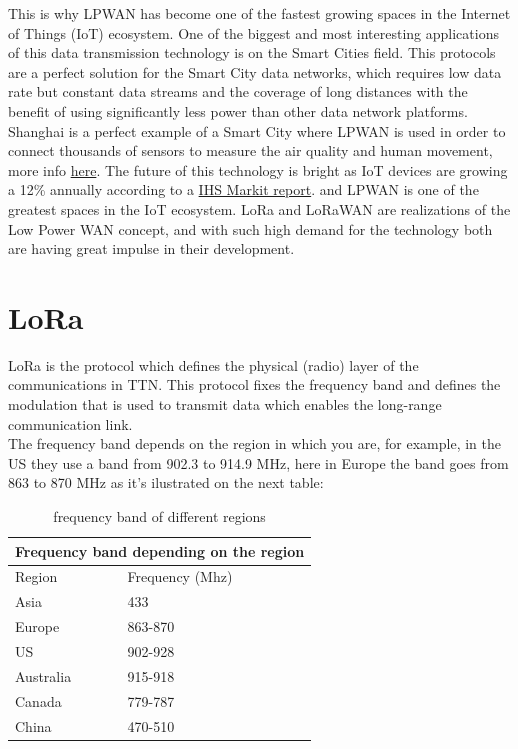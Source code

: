 This is why LPWAN has become one of the fastest growing spaces in
the Internet of Things (IoT) ecosystem. One of the biggest and most
interesting applications of this data transmission technology is on the
Smart Cities field. This protocols are a perfect solution for the Smart City
data networks, which requires low data rate but constant data streams
and the coverage of long distances with the benefit of using significantly
less power than other data network platforms. Shanghai is a perfect
example of a Smart City where LPWAN is used in order to connect
thousands of sensors to measure the air quality and human movement, more info 
\href{https://www.citiesforum.org/news/what-made-shanghai-the-worlds-no-1-smart-city}{here}.
The future of this technology is bright as IoT devices are growing a 12\%
annually according to a \href{https://cdn.ihs.com/www/pdf/IoT_ebook.pdf}{IHS Markit report}.
and LPWAN is one of the greatest spaces in the IoT ecosystem. LoRa and LoRaWAN are
realizations of the Low Power WAN concept, and with such high demand
for the technology both are having great impulse in their development.
\section{LoRa}
\label{sec:f-lora}
LoRa is the protocol which defines the physical (radio) layer of the
communications in TTN. This protocol fixes the
frequency band and defines the modulation that is used to transmit data
which enables the long-range communication link.\\
The frequency band depends on the region in which you are, for
example, in the US they use a band from 902.3 to 914.9 MHz, here in
Europe the band goes from 863 to 870 MHz as it's ilustrated on the next table:\\

\begin{table}[htbp]
\centering
\setlength{\arrayrulewidth}{0.5mm}
\setlength{\tabcolsep}{18pt}
\renewcommand{\arraystretch}{2}
\begin{tabular}{ |p{5cm}|p{5cm}| }
\hline
\multicolumn{2}{|c|}{\cellcolor[HTML]{85C1E9}Frequency band depending on the region } \\
\hline
\cellcolor[HTML]{AED6F1} Region & \cellcolor[HTML]{AED6F1} Frequency (Mhz) \\
\hline
Asia & 433  \\
Europe & 863-870 \\
US & 902-928 \\
Australia & 915-918  \\
Canada & 779-787  \\
China & 470-510  \\
\hline
\end{tabular}
\caption{frequency band of different regions}
\end{table}

